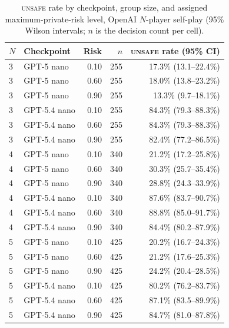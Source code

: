 \documentclass[sigconf]{aamas}
\newcommand{\Unsafe}{\textsc{unsafe}}
\begin{document}
\begin{table}[h]
    \caption{\Unsafe{} rate by checkpoint, group size, and assigned
    maximum-private-risk level, OpenAI $N$-player self-play (95\% Wilson
    intervals; $n$ is the decision count per cell).}
    \label{tab:nplayer-scope-full}
    \centering
    \small
    \begin{tabular}{@{}llrrr@{}}
        \toprule
        $N$ & Checkpoint & Risk & $n$ & \Unsafe{} rate (95\% CI) \\
        \midrule
        3 & GPT-5 nano    & 0.10 & 255 & 17.3\% (13.1--22.4\%) \\
        3 & GPT-5 nano    & 0.60 & 255 & 18.0\% (13.8--23.2\%) \\
        3 & GPT-5 nano    & 0.90 & 255 & 13.3\% (9.7--18.1\%) \\
        3 & GPT-5.4 nano  & 0.10 & 255 & 84.3\% (79.3--88.3\%) \\
        3 & GPT-5.4 nano  & 0.60 & 255 & 84.3\% (79.3--88.3\%) \\
        3 & GPT-5.4 nano  & 0.90 & 255 & 82.4\% (77.2--86.5\%) \\
        4 & GPT-5 nano    & 0.10 & 340 & 21.2\% (17.2--25.8\%) \\
        4 & GPT-5 nano    & 0.60 & 340 & 30.3\% (25.7--35.4\%) \\
        4 & GPT-5 nano    & 0.90 & 340 & 28.8\% (24.3--33.9\%) \\
        4 & GPT-5.4 nano  & 0.10 & 340 & 87.6\% (83.7--90.7\%) \\
        4 & GPT-5.4 nano  & 0.60 & 340 & 88.8\% (85.0--91.7\%) \\
        4 & GPT-5.4 nano  & 0.90 & 340 & 84.4\% (80.2--87.9\%) \\
        5 & GPT-5 nano    & 0.10 & 425 & 20.2\% (16.7--24.3\%) \\
        5 & GPT-5 nano    & 0.60 & 425 & 21.2\% (17.6--25.3\%) \\
        5 & GPT-5 nano    & 0.90 & 425 & 24.2\% (20.4--28.5\%) \\
        5 & GPT-5.4 nano  & 0.10 & 425 & 80.2\% (76.2--83.7\%) \\
        5 & GPT-5.4 nano  & 0.60 & 425 & 87.1\% (83.5--89.9\%) \\
        5 & GPT-5.4 nano  & 0.90 & 425 & 84.7\% (81.0--87.8\%) \\
        \bottomrule
    \end{tabular}
\end{table}


% 



\end{document}
